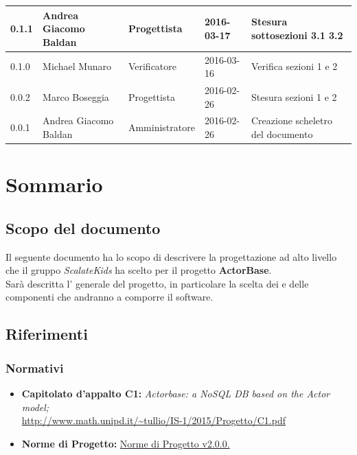 \documentclass{scalatekids-article}
\begin{document}
\begin{center}
\begin{longtable}{| l | l | l | l | p{5cm} |}
    \hline
    0.1.1 & Andrea Giacomo Baldan & Progettista & 2016-03-17 & Stesura sottosezioni 3.1 3.2\\
    \hline
    0.1.0 & Michael Munaro & Verificatore & 2016-03-16 & Verifica sezioni 1 e 2\\
    \hline
    0.0.2 & Marco Boseggia & Progettista & 2016-02-26 & Stesura sezioni 1 e 2\\
    \hline
    0.0.1 & Andrea Giacomo Baldan & Amministratore & 2016-02-26 & Creazione scheletro del documento\\
    \hline
  \end{longtable}
\end{center}
\newpage
\tableofcontents
\newpage
{}

\section{Sommario}

\subsection{Scopo del documento}

Il seguente documento ha lo scopo di descrivere la progettazione ad alto livello
che il gruppo \textit{ScalateKids} ha scelto per il
progetto \textbf{ActorBase}.\\  Sarà descritta l' generale
del progetto, in particolare  la scelta dei  e delle
componenti che andranno a comporre il software.

\prodPurpose

\glossExpl

\subsection{Riferimenti}

\subsubsection{Normativi}

\begin{itemize}

\item\textbf{Capitolato d'appalto C1:} \textit{Actorbase: a NoSQL DB based on the Actor model;}\\
  \url{http://www.math.unipd.it/~tullio/IS-1/2015/Progetto/C1.pdf}
\item\textbf{Norme di Progetto:}
  \href{run:../Interni/NormeDiProgetto\_v2.0.0.pdf}{Norme di Progetto v2.0.0.}
\end{itemize}
\end{document}
